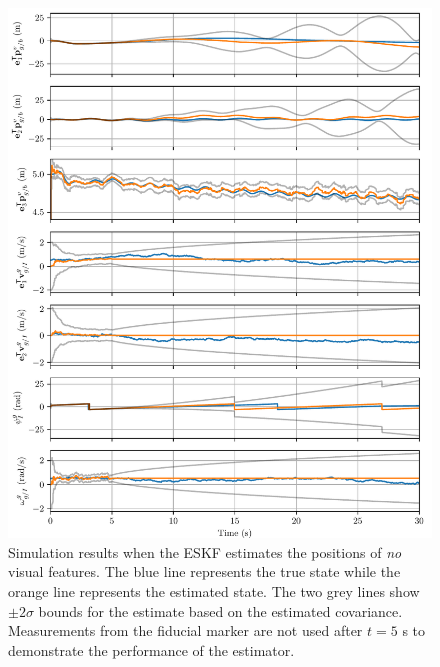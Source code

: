 \begin{figure}
  \centering
  \includegraphics[width=6.5in]{plots/single_run_no_lms}
  \caption[ESKF Simulation Results Using No Visual Features]{Simulation results when the ESKF estimates the positions of \emph{no} visual
  features. The blue line represents the true state while the orange line
  represents the estimated state. The two grey lines show $\pm 2 \sigma$ bounds for
  the estimate based on the estimated covariance. Measurements from the fiducial
  marker are not used after $t = 5$ s
  to demonstrate the performance of the estimator.}
  \label{fig:no_lms}
\end{figure}

